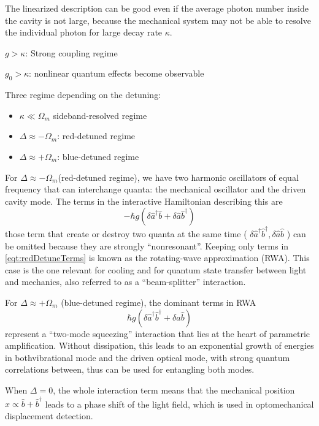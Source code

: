 \documentclass[8pt,a4paper,twocolumn]{article} %
\numberwithin{equation}{section} %
\begin{document}
			The linearized description can be good even if the average photon number inside the cavity is not large, because the mechanical system may not be able to resolve the individual photon for large decay rate $\kappa$.

			$ g>\kappa $: Strong coupling regime

			$g_0>\kappa$: nonlinear quantum effects become observable

			Three regime depending on the detuning:
			\begin{itemize}
				\item $\kappa\ll \Omega_m $ sideband-resolved regime
				\item $ \Delta\approx -\Omega_m $: red-detuned regime
				\item $ \Delta\approx +\Omega_m $: blue-detuned regime
			\end{itemize}

			For $ \Delta\approx -\Omega_m $(red-detuned regime), we have two harmonic oscillators of equal frequency that can interchange quanta: the mechanical oscillator and the driven cavity mode. The terms in the interactive Hamiltonian describing this are
			\begin{equation}
			\label{eqt:redDetuneTerms}
				-\hbar g (\delta \hat a^{\dagger}\hat b+\delta\hat a \hat b^{\dagger} )
			\end{equation}
			those term that create or destroy two quanta at the same time ( $ \delta\hat a^{\dagger} \hat b^{\dagger}, \delta \hat a\hat b $ ) can be omitted because they are strongly ``nonresonant''. Keeping only terms in \ref{eqt:redDetuneTerms} is known as the rotating-wave approximation (RWA). This case is the one relevant for cooling and for quantum state transfer between light and mechanics, also referred to as a ``beam-splitter'' interaction.
			
			For $ \Delta\approx +\Omega_m $ (blue-detuned regime), the dominant terms in RWA
			\begin{equation}
				\hbar g( \delta\hat a^{\dagger} \hat b^{\dagger} + \delta \hat a\hat b )
			\end{equation}
			represent a ``two-mode squeezing'' interaction that lies at the heart of parametric amplification. Without dissipation, this leads to an exponential growth of energies in bothvibrational mode and the driven optical mode, with strong quantum correlations between, thus can be used for entangling both modes.

			When $ \Delta=0 $, the whole interaction term means that the mechanical position $ \hat x \propto \hat b+\hat b^ \dagger $ leads to a phase shift of the light field, which is used in optomechanical displacement detection.
\end{document}
